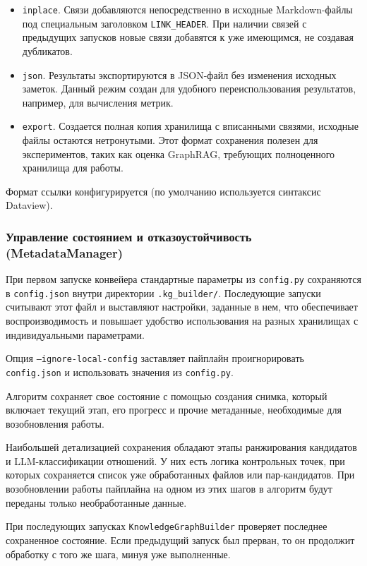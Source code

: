 \begin{itemize}
    \item \texttt{inplace}.
          Связи добавляются непосредственно в исходные Markdown-файлы под специальным заголовком
          \texttt{LINK\_HEADER}.
          При наличии связей с предыдущих запусков
          новые связи добавятся к уже имеющимся, не создавая дубликатов.
    \item \texttt{json}. Результаты экспортируются в JSON-файл без изменения исходных заметок.
          Данный режим создан для удобного переиспользования результатов, например, для вычисления метрик.
    \item \texttt{export}. Создается полная копия хранилища с вписанными связями,
          исходные файлы остаются нетронутыми.
          Этот формат сохранения полезен для экспериментов,
          таких как оценка GraphRAG, требующих полноценного хранилища для работы.
\end{itemize}

Формат ссылки конфигурируется
(по умолчанию используется синтаксис Dataview).

\subsubsection*{Управление состоянием и отказоустойчивость (MetadataManager)}

При первом запуске конвейера стандартные параметры из \texttt{config.py}
сохраняются в \texttt{config.json} внутри директории \texttt{.kg\_builder/}.
Последующие запуски считывают этот файл и выставляют настройки, заданные в нем,
что обеспечивает воспроизводимость и
повышает удобство использования на разных хранилищах с индивидуальными параметрами.

Опция \texttt{--ignore-local-config} заставляет пайплайн
проигнорировать \texttt{config.json} и использовать значения из \texttt{config.py}.

Алгоритм сохраняет свое состояние с помощью создания снимка, который включает
текущий этап,
его прогресс и прочие метаданные, необходимые для возобновления работы.

Наибольшей детализацией сохранения обладают этапы ранжирования кандидатов и LLM-классификации отношений.
У них есть логика контрольных точек, при которых сохраняется список уже обработанных файлов или пар-кандидатов.
При возобновлении работы пайплайна на одном из этих шагов в алгоритм будут переданы только необработанные данные.

При последующих запусках \texttt{KnowledgeGraphBuilder} проверяет последнее сохраненное состояние.
Если предыдущий запуск был прерван, то он продолжит обработку с того же шага, минуя уже выполненные.

